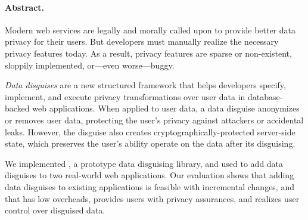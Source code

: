 \paragraph{Abstract.}
Modern web services are legally and morally called upon to provide better
data privacy for their users.
%
But developers must manually realize the necessary privacy
features today. %
As a result, privacy features are sparse or non-existent, sloppily
implemented, or---even worse---buggy.
%

\emph{Data disguises} are a new structured framework that helps
developers specify, implement, and execute privacy transformations over
user data in database-backed web applications.
%
When applied to user data, a data disguise anonymizes or removes user data,
protecting the user's privacy against attackers or accidental leaks.
%
However, the disguise also creates cryptographically-protected server-side
state, which preserves the user's ability operate on the data after its
disguising.
%

We implemented \sys, a prototype data disguising library, and used \sys to
add data disguises to two real-world web applications.
%
Our evaluation shows that adding data disguises to existing applications
is feasible with incremental changes, and that \sys has low overheads,
provides users with privacy assurances, and realizes user control over
disguised data.
%
